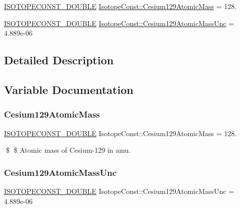\begin{DoxyCompactItemize}
\item 
\mbox{\hyperlink{group___isotope_const-_macros_ga8f45a7272ce02c0b4c65c44636ed719a}{I\+S\+O\+T\+O\+P\+E\+C\+O\+N\+S\+T\+\_\+\+D\+O\+U\+B\+LE}} \mbox{\hyperlink{group___isotope_const-_cesium-_cs129_ga7d09f11a5a9803b06dc15ed645b236d5}{Isotope\+Const\+::\+Cesium129\+Atomic\+Mass}} = 128.
\item 
\mbox{\hyperlink{group___isotope_const-_macros_ga8f45a7272ce02c0b4c65c44636ed719a}{I\+S\+O\+T\+O\+P\+E\+C\+O\+N\+S\+T\+\_\+\+D\+O\+U\+B\+LE}} \mbox{\hyperlink{group___isotope_const-_cesium-_cs129_ga6a839f91e1edaee5d9c0cdcec4320007}{Isotope\+Const\+::\+Cesium129\+Atomic\+Mass\+Unc}} = 4.\+889e-\/06
\end{DoxyCompactItemize}


\subsection{Detailed Description}


\subsection{Variable Documentation}
\mbox{\label{group___isotope_const-_cesium-_cs129_ga7d09f11a5a9803b06dc15ed645b236d5}} 
\subsubsection{\texorpdfstring{Cesium129\+Atomic\+Mass}{Cesium129AtomicMass}}
{\footnotesize\ttfamily \mbox{\hyperlink{group___isotope_const-_macros_ga8f45a7272ce02c0b4c65c44636ed719a}{I\+S\+O\+T\+O\+P\+E\+C\+O\+N\+S\+T\+\_\+\+D\+O\+U\+B\+LE}} Isotope\+Const\+::\+Cesium129\+Atomic\+Mass = 128.}

\$ \$ Atomic mass of Cesium-\/129 in amu. \mbox{\label{group___isotope_const-_cesium-_cs129_ga6a839f91e1edaee5d9c0cdcec4320007}} 
\subsubsection{\texorpdfstring{Cesium129\+Atomic\+Mass\+Unc}{Cesium129AtomicMassUnc}}
{\footnotesize\ttfamily \mbox{\hyperlink{group___isotope_const-_macros_ga8f45a7272ce02c0b4c65c44636ed719a}{I\+S\+O\+T\+O\+P\+E\+C\+O\+N\+S\+T\+\_\+\+D\+O\+U\+B\+LE}} Isotope\+Const\+::\+Cesium129\+Atomic\+Mass\+Unc = 4.\+889e-\/06}

